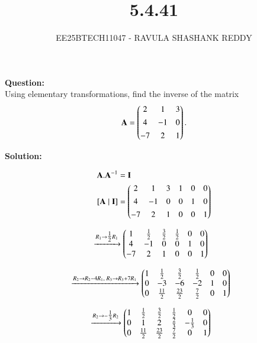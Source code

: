\documentclass[journal]{article}
\begin{document}
	
	
	\vspace{3cm}
	
\title{5.4.41}
\author{EE25BTECH11047 - RAVULA SHASHANK REDDY}
\maketitle
\hrulefill
\bigskip 

\renewcommand{\thetable}{\theenumi}
\setlength{\intextsep}{10pt}

\textbf{Question:} \\

Using elementary transformations, find the inverse of the matrix
\begin{align*}
    \mathbf{A}=\begin{pmatrix}2 & 1 & 3 \\[4pt] 4 & -1 & 0 \\[4pt] -7 & 2 & 1\end{pmatrix}.
\end{align*}

\textbf{Solution:}

\begin{align}
\vec{A}.\vec{A}^{-1}&=\vec{I}\\
[\vec{A}\mid \vec{I}] &= 
\myvec{2 & 1 & 3 & 1 & 0 & 0 \\[4pt]
       4 & -1 & 0 & 0 & 1 & 0 \\[4pt]
      -7 & 2 & 1 & 0 & 0 & 1}
\end{align}

\begin{align}
&\xrightarrow{R_1 \to \tfrac12 R_1}
\begin{pmatrix}1 & \tfrac12 & \tfrac32 & \tfrac12 & 0 & 0 \\
       4 & -1 & 0 & 0 & 1 & 0 \\
      -7 & 2 & 1 & 0 & 0 & 1\end{pmatrix}
\end{align}

\begin{align}
&\xrightarrow{R_2 \to R_2-4R_1,\; R_3 \to R_3+7R_1}
\begin{pmatrix}1 & \tfrac12 & \tfrac32 & \tfrac12 & 0 & 0 \\
       0 & -3 & -6 & -2 & 1 & 0 \\
       0 & \tfrac{11}{2} & \tfrac{23}{2} & \tfrac{7}{2} & 0 & 1\end{pmatrix}
\end{align}

\begin{align}
&\xrightarrow{R_2 \to -\tfrac13 R_2}
\begin{pmatrix}1 & \tfrac12 & \tfrac32 & \tfrac12 & 0 & 0 \\
       0 & 1 & 2 & \tfrac23 & -\tfrac13 & 0 \\
       0 & \tfrac{11}{2} & \tfrac{23}{2} & \tfrac{7}{2} & 0 & 1\end{pmatrix}
\end{align}
\end{document}
